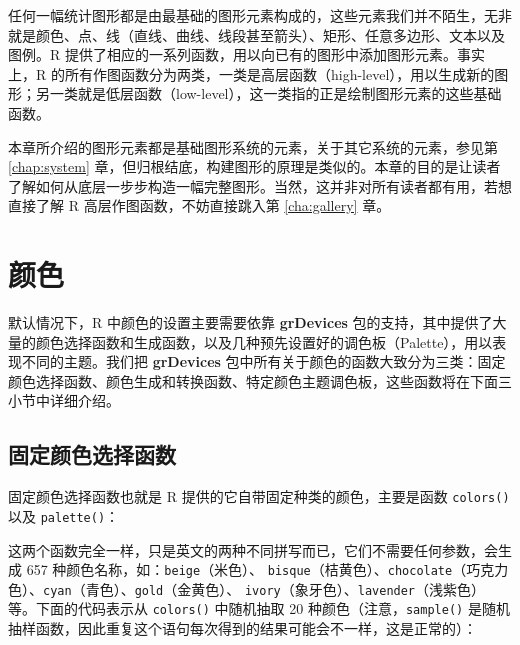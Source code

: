 \documentclass[
  b5paper,
  UTF8,twoside]{book}
\providecommand{\tightlist}{%
  \setlength{\itemsep}{0pt}\setlength{\parskip}{0pt}}
\begin{document}
任何一幅统计图形都是由最基础的图形元素构成的，这些元素我们并不陌生，无非就是颜色、点、线（直线、曲线、线段甚至箭头）、矩形、任意多边形、文本以及图例。R 提供了相应的一系列函数，用以向已有的图形中添加图形元素。事实上，R 的所有作图函数分为两类，一类是高层函数（high-level），用以生成新的图形；另一类就是低层函数（low-level），这一类指的正是绘制图形元素的这些基础函数。

本章所介绍的图形元素都是基础图形系统的元素，关于其它系统的元素，参见第 \ref{chap:system} 章，但归根结底，构建图形的原理是类似的。本章的目的是让读者了解如何从底层一步步构造一幅完整图形。当然，这并非对所有读者都有用，若想直接了解 R 高层作图函数，不妨直接跳入第 \ref{cha:gallery} 章。

\hypertarget{sec:color}{%
\section{颜色}\label{sec:color}}

默认情况下，R 中颜色的设置主要需要依靠 \textbf{grDevices} 包的支持，其中提供了大量的颜色选择函数和生成函数，以及几种预先设置好的调色板（Palette），用以表现不同的主题。我们把 \textbf{grDevices} 包中所有关于颜色的函数大致分为三类：固定颜色选择函数、颜色生成和转换函数、特定颜色主题调色板，这些函数将在下面三小节中详细介绍。

\hypertarget{sec:palette}{%
\subsection{固定颜色选择函数}\label{sec:palette}}

固定颜色选择函数也就是 R 提供的它自带固定种类的颜色，主要是函数 \texttt{colors()} 以及 \texttt{palette()}：

\begin{description}
\tightlist
\item[\texttt{colors(),\ colours()}]
这两个函数完全一样，只是英文的两种不同拼写而已，它们不需要任何参数，会生成 657 种颜色名称，如：\texttt{\textquotesingle{}beige\textquotesingle{}}（米色）、 \texttt{\textquotesingle{}bisque\textquotesingle{}}（桔黄色）、\texttt{\textquotesingle{}chocolate\textquotesingle{}}（巧克力色）、\texttt{\textquotesingle{}cyan\textquotesingle{}}（青色）、\texttt{\textquotesingle{}gold\textquotesingle{}}（金黄色）、 \texttt{\textquotesingle{}ivory\textquotesingle{}}（象牙色）、\texttt{\textquotesingle{}lavender\textquotesingle{}}（浅紫色）等。下面的代码表示从 \texttt{colors()} 中随机抽取 20 种颜色（注意，\texttt{sample()} 是随机抽样函数，因此重复这个语句每次得到的结果可能会不一样，这是正常的）：
\end{description}
\end{document}
